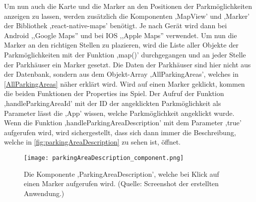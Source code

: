 Um nun auch die Karte und die Marker an den Positionen der Parkmöglichkeiten anzeigen zu lassen, werden zusätzlich die Komponenten ,MapView' und ,Marker' der Bibliothek ,react-native-maps' benötigt. Je nach Gerät wird dann bei Android ,,Google Maps'' und bei IOS ,,Apple Maps'' verwendet. Um nun die Marker an den richtigen Stellen zu plazieren, wird die Liste aller Objekte der Parkmöglichkeiten mit der Funktion ,map()' durchgegangen und an jeder Stelle der Parkhäuser ein Marker gesetzt. Die Daten der Parkhäuser sind hier nicht aus der Datenbank, sondern aus dem Objekt-Array ,AllParkingAreas', welches in \autoref{AllParkingAreas} näher erklärt wird. Wird auf einen Marker geklickt, kommen die beiden Funktionen der Properties ins Spiel. Der Aufruf der Funktion ,handleParkingAreaId' mit der ID der angeklickten Parkmöglichkeit als Parameter lässt die ,App' wissen, welche Parkmöglichkeit angeklickt wurde. Wenn die Funktion ,handleParkingAreaDescription' mit dem Parameter ,true' aufgerufen wird, wird sichergestellt, dass sich dann immer die Beschreibung, welche in \autoref{fig:parkingAreaDescription} zu sehen ist, öffnet.

\begin{figure}[h!]
	\centering
	\texttt{[image: parkingAreaDescription\_component.png]}
	\caption[Die Komponente ,ParkingAreaDescription', welche bei Klick auf einen Marker aufgerufen wird.]
	{Die Komponente ,ParkingAreaDescription', welche bei Klick auf einen Marker aufgerufen wird. (Quelle: Screenshot der erstellten Anwendung.)}
	\label{fig:parkingAreaDescription}
\end{figure}

